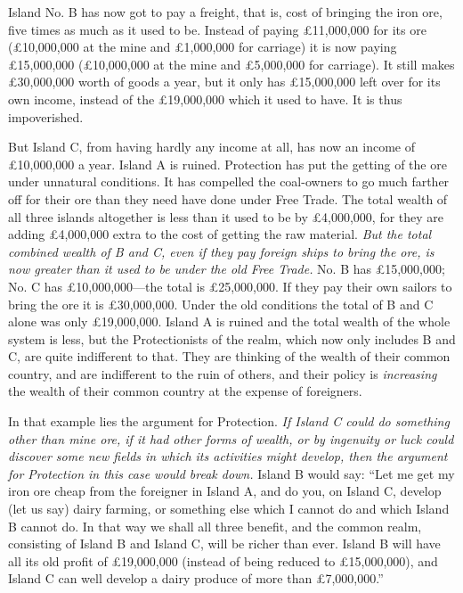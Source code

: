 \documentclass{book}
\begin{document}
Island No. B has now got to pay a freight, that is, cost of bringing the iron ore, five times as much as it used to be. Instead of paying £11,000,000 for its ore (£10,000,000 at the mine and £1,000,000 for carriage) it is now paying £15,000,000 (£10,000,000 at the mine and £5,000,000 for carriage). It still makes £30,000,000 worth of goods a year, but it only has £15,000,000 left over for its own income, instead of the £19,000,000 which it used to have. It is thus impoverished.

But Island C, from having hardly any income at all, has now an income of £10,000,000 a year. Island A is ruined. Protection has put the getting of the ore under unnatural conditions. It has compelled the coal-owners to go much farther off for their ore than they need have done under Free Trade. The total wealth of all three islands altogether is less than it used to be by £4,000,000, for they are adding £4,000,000 extra to the cost of getting the raw material. \emph{But the total combined wealth of B and C, even if they pay foreign ships to bring the ore, is now greater than it used to be under the old Free Trade.} No. B has £15,000,000; No. C has £10,000,000—the total is £25,000,000. If they pay their own sailors to bring the ore it is £30,000,000. Under the old conditions the total of B and C alone was only £19,000,000. Island A is ruined and the total wealth of the whole system is less, but the Protectionists of the realm, which now only includes B and C, are quite indifferent to that. They are thinking of the wealth of their common country, and are indifferent to the ruin of others, and their policy is \emph{increasing} the wealth of their common country at the expense of foreigners.

In that example lies the argument for Protection. \emph{If Island C could do something other than mine ore, if it had other forms of wealth, or by ingenuity or luck could discover some new fields in which its activities might develop, then the argument for Protection in this case would break down.} Island B would say: “Let me get my iron ore cheap from the foreigner in Island A, and do you, on Island C, develop (let us say) dairy farming, or something else which I cannot do and which Island B cannot do. In that way we shall all three benefit, and the common realm, consisting of Island B and Island C, will be richer than ever. Island B will have all its old profit of £19,000,000 (instead of being reduced to £15,000,000), and Island C can well develop a dairy produce of more than £7,000,000.”
\end{document}
